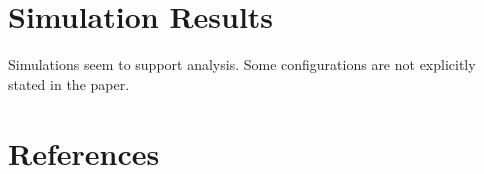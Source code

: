 \documentclass[conference]{IEEEtran}
\begin{document}
\section{Simulation Results}
Simulations seem to support analysis.
Some configurations are not explicitly stated in the paper.

\section*{References}


%
%
\end{document}
